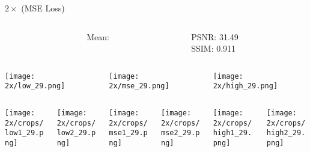 \documentclass[xcolor={dvipsnames}]{beamer}
\newcommand{\skipbutton}[2]{\hyperlink{#1}{\beamerbutton{#2}}}
\begin{document}
\begin{frame}{\(2\times\) (MSE Loss)}\label{frame:mse_2}
	\begin{columns}
		\begin{column}{0.5\textwidth}
			
		\end{column}
		\begin{column}{0.1\textwidth}
			Mean:\\\phantom{Hallo}
		\end{column}
		\begin{column}{0.4\textwidth}
			PSNR: 31.49 \\
			SSIM: 0.911
		\end{column}
	\end{columns}
	\begin{columns}
	\begin{column}{0.3\linewidth}
		\texttt{[image: 2x/low\_29.png]}
		\begin{columns}
		\begin{column}{0.5\linewidth}
			\texttt{[image: 2x/crops/low1\_29.png]}
		\end{column}
		\begin{column}{0.5\linewidth}
			\texttt{[image: 2x/crops/low2\_29.png]}
		\end{column}
		\end{columns}
	\end{column}
	\begin{column}{0.3\textwidth}
		\texttt{[image: 2x/mse\_29.png]}
		\begin{columns}
			\begin{column}{0.5\linewidth}
				\texttt{[image: 2x/crops/mse1\_29.png]}
			\end{column}
			\begin{column}{0.5\linewidth}
				\texttt{[image: 2x/crops/mse2\_29.png]}
			\end{column}
		\end{columns}
	\end{column}
	\begin{column}{0.3\textwidth}
		\texttt{[image: 2x/high\_29.png]}
		\begin{columns}
			\begin{column}{0.5\linewidth}
				\texttt{[image: 2x/crops/high1\_29.png]}
			\end{column}
			\begin{column}{0.5\linewidth}
				\texttt{[image: 2x/crops/high2\_29.png]}
			\end{column}
		\end{columns}
	\end{column}
	\end{columns}
	
	\hfill
	\skipbutton{frame:mse_chained_4}{\(4\times\)}
	\skipbutton{frame:mse_chained_8}{\(8\times\)}
	\skipbutton{frame:psnr}{PSNR}
	\skipbutton{frame:ssim}{SSIM}
\end{frame}
\end{document}
